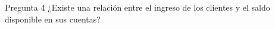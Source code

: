 Pregunta 4
¿Existe una relación entre el ingreso de los clientes
y el saldo disponible en sus cuentas?
